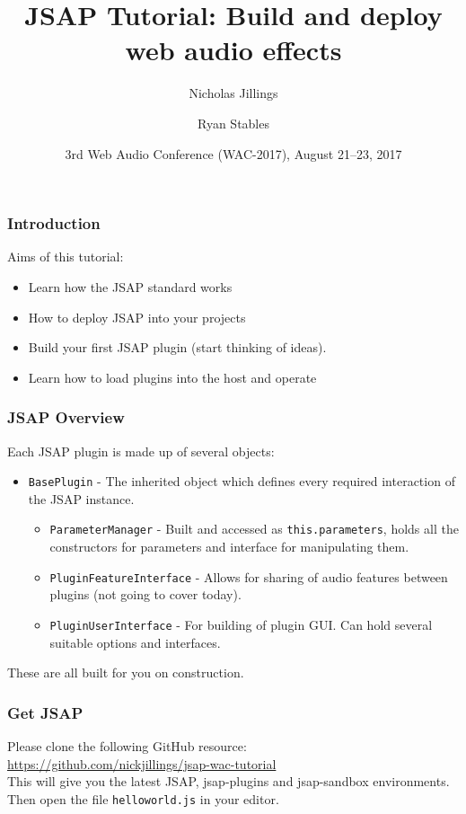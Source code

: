 \documentclass{beamer}
\title[JSAP Tutorial]{JSAP Tutorial: Build and deploy web audio effects}
\author[Jillings and Stables]%
{Nicholas Jillings \and Ryan Stables}
\institute[BCU]
{
  Digital Media Technology Lab\\
  Birmingham City University\\
  Curzon Street, Birmingham, UK
}
\date[WAC 2017] %
{3rd Web Audio Conference (WAC-2017), August 21--23, 2017}
\begin{document}
 
\frame{\titlepage}

\begin{frame}
\frametitle{Introduction}

Aims of this tutorial:
\begin{itemize}
\item Learn how the JSAP standard works
\item How to deploy JSAP into your projects
\item Build your first JSAP plugin (start thinking of ideas).
\item Learn how to load plugins into the host and operate
\end{itemize}

\end{frame}

\begin{frame}
\frametitle{JSAP Overview}
Each JSAP plugin is made up of several objects:
\begin{itemize}
\item \texttt{BasePlugin} - The inherited object which defines every required interaction of the JSAP instance.
\begin{itemize}
\item \texttt{ParameterManager} - Built and accessed as \texttt{this.parameters}, holds all the constructors for parameters and interface for manipulating them.
\item \texttt{PluginFeatureInterface} - Allows for sharing of audio features between plugins (not going to cover today).
\item \texttt{PluginUserInterface} - For building of plugin GUI. Can hold several suitable options and interfaces.
\end{itemize}
\end{itemize}
These are all built for you on construction.
\end{frame}

\begin{frame}
\frametitle{Get JSAP}
Please clone the following GitHub resource:\\
\url{https://github.com/nickjillings/jsap-wac-tutorial}\\
This will give you the latest JSAP, jsap-plugins and jsap-sandbox environments.\\
Then open the file \texttt{helloworld.js} in your editor.\\
\end{frame}
\end{document}
